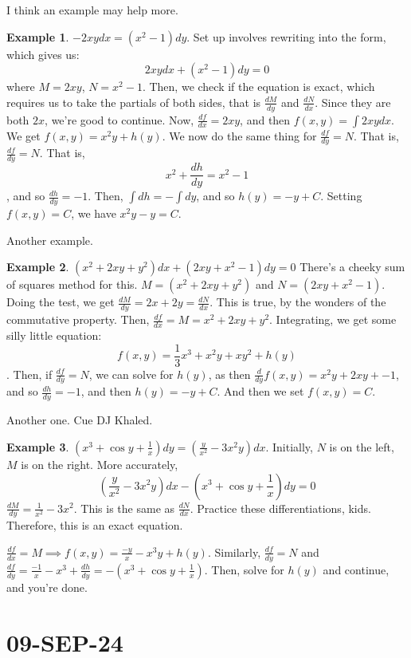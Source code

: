 \documentclass[10pt, oneside]{article}
\theoremstyle{definition}
\newtheorem{example}{Example}[section]
\begin{document}
I think an example may help more.
\begin{example}
    $-2xy dx = (x^2-1)dy$. Set up involves rewriting into the form, which gives us:
    \[2xy dx + (x^2-1)dy = 0\] where $M = 2xy$, $N = x^2 -1$. Then, we check if the equation is exact, which requires us to take the partials of both sides, that is $\frac{dM}{dy}$ and $\frac{dN}{dx}$. Since they are both $2x$, we're good to continue. 
    Now, $\frac{df}{dx} = 2xy$, and then $f(x,y) = \int{2xy}dx$. We get $f(x,y) = x^2y + h(y)$. We now do the same thing for $\frac{df}{dy} = N$. That is, $\frac{df}{dy} = N$. That is, \[x^2 + \frac{dh}{dy} = x^2 - 1\], and so $\frac{dh}{dy} = -1$. Then, $\int{dh} = -\int{dy}$, and so $h(y) = -y + C$. Setting $f(x,y) = C$, we have $x^2y - y = C$. 
\end{example}
Another example. 
\begin{example}
    $(x^2 + 2xy + y^2)dx + (2xy+x^2-1)dy = 0$
    There's a cheeky sum of squares method for this. 
    $M = (x^2 + 2xy + y^2)$ and $N = (2xy+x^2-1)$. Doing the test, we get $\frac{dM}{dy} = 2x + 2y = \frac{dN}{dx}$. This is true, by the wonders of the commutative property. Then, $\frac{df}{dx} = M = x^2 + 2xy + y^2$. Integrating, we get some silly little equation:
    \[f(x,y) = \frac{1}{3}x^3 + x^2y + xy^2 + h(y) \]. Then, if $\frac{df}{dy} = N$, we can solve for $h(y)$, as then $\frac{d}{dy}{f(x,y)} = x^2y + 2xy + - 1$, and so $\frac{dh}{dy} = -1$, and then $h(y) = -y + C$. And then we set $f(x,y) = C$. 
\end{example}
Another one. Cue DJ Khaled. 
\begin{example}
    $(x^3 + \cos{y} + \frac{1}{x})dy = (\frac{y}{x^2}-3x^2y)dx$. Initially, $N$ is on the left, $M$ is on the right.
    More accurately, 
    \[
        (\frac{y}{x^2}-3x^2y)dx - (x^3 + \cos{y} + \frac{1}{x})dy = 0
    \]
    $\frac{dM}{dy} = \frac{1}{x^2} - 3x^2$. This is the same as $\frac{dN}{dx}$. Practice these differentiations, kids. Therefore, this is an exact equation. 

    $\frac{df}{dx} = M \implies f(x,y) = \frac{-y}{x} - x^3y + h(y)$. Similarly, $\frac{df}{dy} = N$ and $\frac{df}{dy} = \frac{-1}{x} - x^3 + \frac{dh}{dy} = - (x^3 + \cos{y} + \frac{1}{x})$. Then, solve for $h(y)$ and continue, and you're done. 

\end{example}
\section{09-SEP-24}
\end{document}
